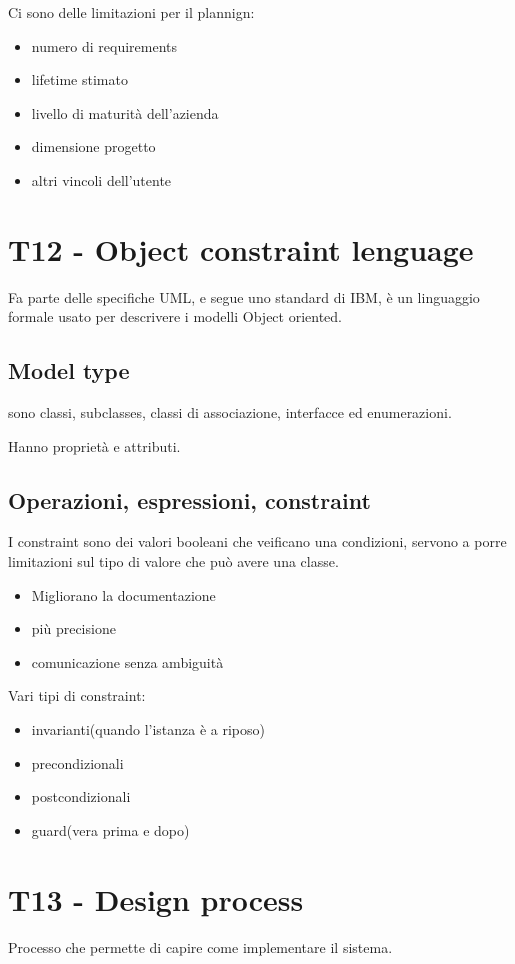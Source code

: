 \documentclass{article}
\begin{document}
Ci sono delle limitazioni per il plannign:
\begin{itemize}
    \item numero di requirements
    \item lifetime stimato
    \item livello di maturità dell'azienda
    \item dimensione progetto
    \item altri vincoli dell'utente
\end{itemize}
\setcounter{section}{11}
\section{T12 - Object constraint lenguage}
Fa parte delle specifiche UML, e segue uno standard di IBM, è un linguaggio 
formale usato per descrivere i modelli Object oriented.
\subsection{Model type}
sono classi, subclasses, classi di associazione, interfacce ed enumerazioni.

Hanno proprietà e attributi.
\subsection{Operazioni, espressioni, constraint}
I constraint sono dei valori booleani che veificano una condizioni, servono
a porre limitazioni sul tipo di valore che può avere una classe.

\begin{itemize}
    \item Migliorano la documentazione
    \item più precisione
    \item comunicazione senza ambiguità
\end{itemize}

Vari tipi di constraint:
\begin{itemize}
    \item invarianti(quando l'istanza è a riposo)
    \item precondizionali
    \item postcondizionali
    \item guard(vera prima e dopo)
\end{itemize}

\section{T13 - Design process}
Processo che permette di capire come implementare il sistema.
\end{document}
